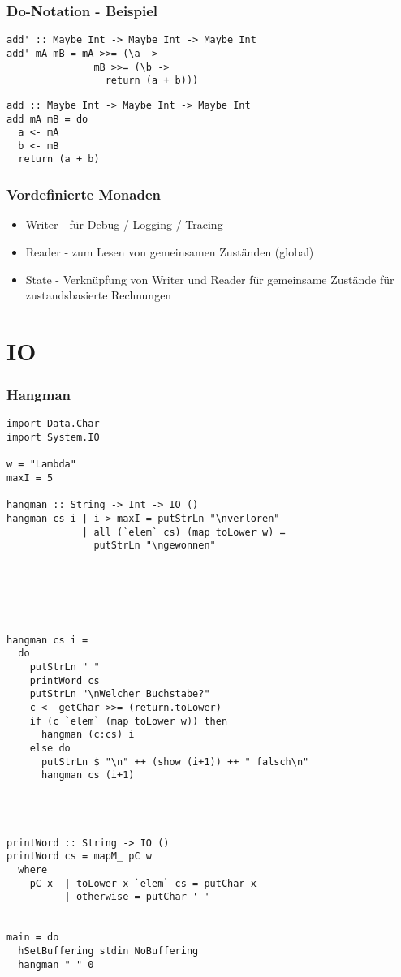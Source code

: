 \documentclass[fleqn,11pt,aspectratio=43]{beamer}
\begin{document}
\begin{frame}[fragile]
\frametitle{Do-Notation - Beispiel}
\begin{lstlisting}
add' :: Maybe Int -> Maybe Int -> Maybe Int
add' mA mB = mA >>= (\a ->
               mB >>= (\b ->
                 return (a + b)))
\end{lstlisting}	
\pause
\begin{lstlisting}
add :: Maybe Int -> Maybe Int -> Maybe Int
add mA mB = do
  a <- mA
  b <- mB
  return (a + b)
\end{lstlisting}
\end{frame}

\begin{frame}
\frametitle{Vordefinierte Monaden}
\begin{block}{\vspace*{-3ex}}
\begin{itemize}
\item Writer - für Debug / Logging / Tracing
\item Reader - zum Lesen von gemeinsamen Zuständen (global)
\item State - Verknüpfung von Writer und Reader für gemeinsame Zustände für zustandsbasierte Rechnungen
\end{itemize}
\end{block}
\end{frame}

\section{IO}

\begin{frame}
\frametitle{Hangman}
\begin{lstlisting}
import Data.Char
import System.IO

w = "Lambda"
maxI = 5

hangman :: String -> Int -> IO ()
hangman cs i | i > maxI = putStrLn "\nverloren"
             | all (`elem` cs) (map toLower w) = 
               putStrLn "\ngewonnen"






hangman cs i = 
  do
    putStrLn " "
    printWord cs
    putStrLn "\nWelcher Buchstabe?"
    c <- getChar >>= (return.toLower)
    if (c `elem` (map toLower w)) then
      hangman (c:cs) i 
    else do
      putStrLn $ "\n" ++ (show (i+1)) ++ " falsch\n"
      hangman cs (i+1)




printWord :: String -> IO ()
printWord cs = mapM_ pC w 
  where
    pC x  | toLower x `elem` cs = putChar x
          | otherwise = putChar '_'

          
main = do
  hSetBuffering stdin NoBuffering
  hangman " " 0
\end{lstlisting}	
\end{frame}
\end{document}
